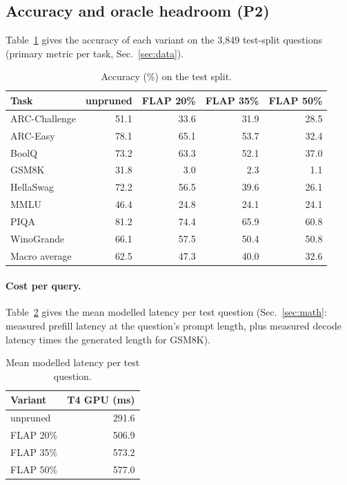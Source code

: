 \subsection{Accuracy and oracle headroom (P2)}
Table~\ref{tab:acc} gives the accuracy of each variant on the 3{,}849 test-split questions (primary metric per task, Sec.~\ref{sec:data}).

\begin{table}[!htbp]\centering\small
\begin{tabular}{lrrrr}
\toprule
Task & unpruned & FLAP 20\% & FLAP 35\% & FLAP 50\% \\
\midrule
ARC-Challenge & 51.1 & 33.6 & 31.9 & 28.5 \\
ARC-Easy & 78.1 & 65.1 & 53.7 & 32.4 \\
BoolQ & 73.2 & 63.3 & 52.1 & 37.0 \\
GSM8K & 31.8 & 3.0 & 2.3 & 1.1 \\
HellaSwag & 72.2 & 56.5 & 39.6 & 26.1 \\
MMLU & 46.4 & 24.8 & 24.1 & 24.1 \\
PIQA & 81.2 & 74.4 & 65.9 & 60.8 \\
WinoGrande & 66.1 & 57.5 & 50.4 & 50.8 \\
\midrule
Macro average & 62.5 & 47.3 & 40.0 & 32.6 \\
\bottomrule
\end{tabular}
\caption{Accuracy (\%) on the test split.}\label{tab:acc}
\end{table}

\paragraph{Cost per query.} Table~\ref{tab:cost} gives the mean modelled latency per test question (Sec.~\ref{sec:math}: measured prefill latency at the question's prompt length, plus measured decode latency times the generated length for GSM8K).

\begin{table}[!htbp]\centering\small
\begin{tabular}{lr}
\toprule
Variant & T4 GPU (ms) \\
\midrule
unpruned & 291.6 \\
FLAP 20\% & 506.9 \\
FLAP 35\% & 573.2 \\
FLAP 50\% & 577.0 \\
\bottomrule
\end{tabular}
\caption{Mean modelled latency per test question.}\label{tab:cost}
\end{table}

